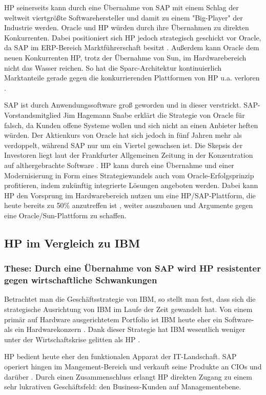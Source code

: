 \documentclass[a4paper,10pt,left=1.5cm,right=1.5cm,top=1.5cm,bottom=1.5cm]{article}
\begin{document}
HP seinerseits kann durch eine Übernahme von SAP mit einem Schlag der weltweit viertgrößte Softwarehersteller \cite{sap} und damit zu einem "Big-Player" der Industrie werden.
Oracle und HP würden durch ihre Übernahmen zu direkten Konkurrenten.
Dabei positioniert sich HP jedoch strategisch geschickt vor Oracle, da SAP im ERP-Bereich Marktführerschaft besitzt \cite{erpmarket}.
Außerdem kann Oracle dem neuen Konkurrenten HP, trotz der Übernahme von Sun, im Hardwarebereich nicht das Wasser reichen.
So hat die Sparc-Architektur kontinuierlich Marktanteile gerade gegen die konkurrierenden Plattformen von HP u.a. verloren \cite{sparc}.

SAP ist durch Anwendungssoftware groß geworden und in dieser verstrickt.
SAP-Vorstandsmitglied Jim Hagemann Snabe erklärt die Strategie von Oracle für falsch, da Kunden offene Systeme wollen und sich nicht an einen Anbieter heften würden.
Der Aktienkurs von Oracle hat sich jedoch in fünf Jahren mehr als verdoppelt, während SAP nur um ein Viertel gewachsen ist.
Die Skepsis der Investoren liegt laut der Frankfurter Allgemeinen Zeitung in der Konzentration auf althergebrachte Software \cite{faz}.
HP kann durch eine Übernahme und einer Modernisierung in Form eines Strategiewandels auch vom Oracle-Erfolgsprinzip profitieren, indem zukünftig integrierte Lösungen angeboten werden.
Dabei kann HP den Vorsprung im Hardwarebereich nutzen um eine HP/SAP-Plattform, 
die heute bereits zu 50\% anzutreffen ist \cite{50percent}, 
weiter auszubauen und Argumente gegen eine Oracle/Sun-Plattform zu schaffen.

\subsection*{HP im Vergleich zu IBM}

\subsubsection*{These: Durch eine Übernahme von SAP wird HP resistenter gegen wirtschaftliche Schwankungen}

Betrachtet man die Geschäftsstrategie von IBM, so stellt man fest, dass sich die strategische Ausrichtung von IBM im Laufe der Zeit gewandelt hat.
Von einem primär auf Hardware ausgerichtetem Portfolio ist IBM heute eher ein Software- als ein Hardwarekonzern \cite{ibmvshp}.
Dank dieser Strategie hat IBM wesentlich weniger unter der Wirtschaftskrise gelitten als HP \cite{ibmvshp}.

HP bedient heute eher den funktionalen Apparat der IT-Landschaft.
SAP operiert hingen im Mangement-Bereich und verkauft seine Produkte an CIOs und darüber \cite{cioandabove}.
Durch einen Zusammenschluss erlangt HP direkten Zugang zu einem sehr lukrativen Geschäftsfeld: den Business-Kunden auf Managementebene.
\end{document}
